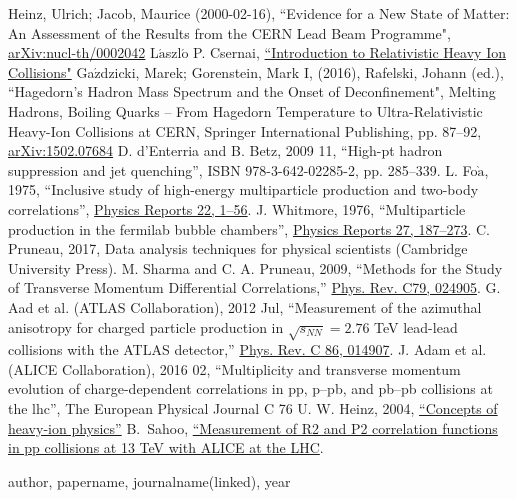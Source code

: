 \begin{thebibliography}{50}
 Heinz, Ulrich; Jacob, Maurice (2000-02-16), ``Evidence for a New State of Matter: An Assessment of the Results from the CERN Lead Beam Programme", \href{https://arxiv.org/abs/nucl-th/0002042}{arXiv:nucl-th/0002042}
 L$\acute{\mathrm{a}}$szl$\acute{\mathrm{o}}$ P. Csernai, \href{http://www.csernai.no/Csernai-textbook.pdf}{``Introduction to Relativistic Heavy Ion Collisions"}
 Ga$\acute{\mathrm{z}}$dzicki, Marek; Gorenstein, Mark I, (2016), Rafelski, Johann (ed.), ``Hagedorn's Hadron Mass Spectrum and the Onset of Deconfinement", Melting Hadrons, Boiling Quarks – From Hagedorn Temperature to Ultra-Relativistic Heavy-Ion Collisions at CERN, Springer International Publishing, pp. 87–92, \href{https://arxiv.org/abs/1502.07684}{arXiv:1502.07684}
 D. d’Enterria and B. Betz, 2009 11, ``High-pt hadron suppression and jet quenching”, ISBN 978-3-642-02285-2, pp. 285–339.
 L. Fo$\grave{\mathrm{a}}$, 1975, ``Inclusive study of high-energy multiparticle production and two-body correlations”, \href{http://dx.doi.org/https://doi.org/10.1016/0370-1573(75)90050-2}{Physics Reports 22, 1–56}.
 J. Whitmore, 1976, ``Multiparticle production in the fermilab bubble chambers”, \href{http://dx.doi.org/https://doi.org/10.1016/0370-1573(76)90004-1}{Physics Reports 27, 187–273}.
 C. Pruneau, 2017, Data analysis techniques for physical scientists (Cambridge University Press).
  M. Sharma and C. A. Pruneau, 2009, ``Methods for the Study of Transverse Momentum Differential Correlations,” \href{https://journals.aps.org/prc/abstract/10.1103/PhysRevC.79.024905}{Phys. Rev. C79, 024905}.
  G. Aad et al. (ATLAS Collaboration), 2012 Jul, ``Measurement of the azimuthal anisotropy for charged particle production in $\sqrt{s_{NN}} = 2.76$ TeV lead-lead collisions with the ATLAS detector,” \href{http://dx.doi.org/10.1103/PhysRevC.86.014907}{Phys. Rev. C 86, 014907}.
  J. Adam et al. (ALICE Collaboration), 2016 02, ``Multiplicity and transverse momentum evolution of charge-dependent correlations in pp, p–pb, and pb–pb collisions at the lhc”,  The European Physical Journal C 76
  U. W. Heinz, 2004, \href{https://arxiv.org/abs/hep-ph/0407360}{``Concepts of heavy-ion physics”}
  B.~Sahoo, \href{https://inspirehep.net/literature/2640257}{``Measurement of R2 and P2 correlation functions in pp collisions at 13 TeV with ALICE at the LHC}.
\end{thebibliography}


author, papername, journalname(linked), year